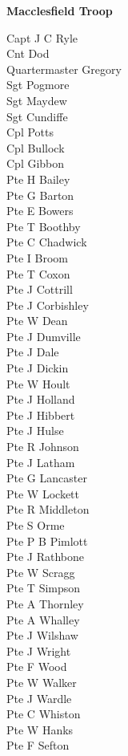 \begin{center}
  \Large
  \textbf{Macclesfield Troop}
\end{center}

\begin{multicols}{2}
  \noindent
  Capt J C Ryle \\
  Cnt Dod \\
  Quartermaster Gregory \\
  Sgt Pogmore \\
  Sgt Maydew \\
  Sgt Cundiffe \\
  Cpl Potts \\
  Cpl Bullock \\
  Cpl Gibbon \\
  Pte H Bailey \\
  Pte G Barton \\
  Pte E Bowers \\
  Pte T Boothby \\
  Pte C Chadwick \\
  Pte I Broom \\
  Pte T Coxon \\
  Pte J Cottrill \\
  Pte J Corbishley \\
  Pte W Dean \\
  Pte J Dumville \\
  Pte J Dale \\
  Pte J Dickin \\
  Pte W Hoult \\
  Pte J Holland \\
  Pte J Hibbert \\
  Pte J Hulse \\
  Pte R Johnson \\
  Pte J Latham \\
  Pte G Lancaster \\
  Pte W Lockett \\
  Pte R Middleton \\
  Pte S Orme \\
  Pte P B Pimlott \\
  Pte J Rathbone \\
  Pte W Scragg \\
  Pte T Simpson \\
  Pte A Thornley \\
  Pte A Whalley \\
  Pte J Wilshaw \\
  Pte J Wright \\
  Pte F Wood \\
  Pte W Walker \\
  Pte J Wardle \\
  Pte C Whiston \\
  Pte W Hanks \\
  Pte F Sefton \\
\end{multicols}

